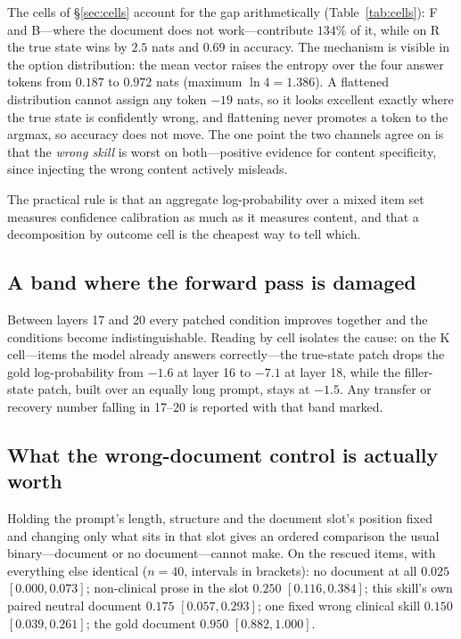 \documentclass{article}
\begin{document}
The cells of \S\ref{sec:cells} account for the gap arithmetically
(Table~\ref{tab:cells}): F and B---where the document does not work---contribute
$134\%$ of it, while on R the true state wins by $2.5$ nats and $0.69$ in
accuracy. The mechanism is visible in the option distribution: the mean vector
raises the entropy over the four answer tokens from $0.187$ to $0.972$ nats
(maximum $\ln 4 = 1.386$). A flattened distribution cannot assign any token
$-19$ nats, so it looks excellent exactly where the true state is confidently
wrong, and flattening never promotes a token to the argmax, so accuracy does not
move. The one point the two channels agree on is that the \emph{wrong skill} is
worst on both---positive evidence for content specificity, since injecting the
wrong content actively misleads.

The practical rule is that an aggregate log-probability over a mixed item set
measures confidence calibration as much as it measures content, and that a
decomposition by outcome cell is the cheapest way to tell which.

\subsection{A band where the forward pass is damaged}

Between layers 17 and 20 every patched condition improves together and the
conditions become indistinguishable. Reading by cell isolates the cause: on the
K cell---items the model already answers correctly---the true-state patch drops
the gold log-probability from $-1.6$ at layer 16 to $-7.1$ at layer 18, while
the filler-state patch, built over an equally long prompt, stays at $-1.5$. Any
transfer or recovery number falling in 17--20 is reported with that band marked.

\subsection{What the wrong-document control is actually worth}


Holding the prompt's length, structure and the document slot's position fixed and
changing only what sits in that slot gives an ordered comparison the usual
binary---document or no document---cannot make. On the rescued items, with
everything else identical ($n=40$, intervals in brackets): no document at all
$0.025$ $[0.000, 0.073]$; non-clinical prose in the slot $0.250$
$[0.116, 0.384]$; this skill's own paired neutral document $0.175$
$[0.057, 0.293]$; one fixed wrong clinical skill $0.150$ $[0.039, 0.261]$; the
gold document $0.950$ $[0.882, 1.000]$.
\end{document}
